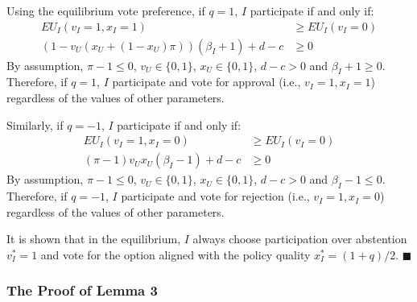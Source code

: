 \par Using the equilibrium vote preference, if $q=1$, $I$ participate if and only if:
\begin{align*}
EU_I(v_I=1,x_I=1) &\geq EU_I(v_I=0) \\
(1- v_U(x_U + (1-x_U) \pi )) (\beta_I + 1) + d - c &\geq 0 
\end{align*}
\noindent By assumption, $\pi - 1 \leq 0$, $v_U \in \{0, 1\}$, $x_U  \in \{0, 1\}$, $d - c > 0$ and $\beta_I + 1 \geq 0$. Therefore, if $q=1$, $I$ participate and vote for approval (i.e., $v_I=1, x_I=1$) regardless of the values of other parameters.  

\par Similarly, if $q=-1$, $I$ participate if and only if:
\begin{align*}
EU_I(v_I=1,x_I=0) &\geq EU_I(v_I=0)  \\
(\pi - 1) v_U x_U (\beta_I - 1) + d - c &\geq 0 
\end{align*}
\noindent By assumption, $\pi - 1 \leq 0$, $v_U \in \{0, 1\}$, $x_U  \in \{0, 1\}$, $d - c > 0$ and $\beta_I - 1 \leq 0$. Therefore, if $q=-1$, $I$ participate and vote for rejection (i.e., $v_I=1, x_I=0$) regardless of the values of other parameters. 

\par It is shown that in the equilibrium, $I$ always choose participation over abstention $v^*_I=1$ and vote for the option aligned with the policy quality $x^*_I=(1+q)/2$. \hfill $\blacksquare$

\subsubsection{The Proof of Lemma 3}

